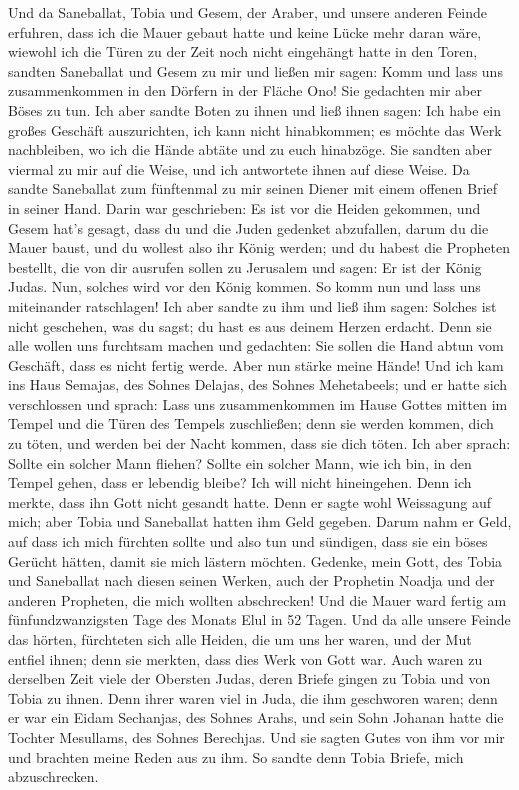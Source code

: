  Und da Saneballat, Tobia und Gesem, der Araber, und
unsere anderen Feinde erfuhren, dass ich die Mauer gebaut hatte und
keine Lücke mehr daran wäre, wiewohl ich die Türen zu der Zeit noch
nicht eingehängt hatte in den Toren,  sandten Saneballat
und Gesem zu mir und ließen mir sagen: Komm und lass uns zusammenkommen
in den Dörfern in der Fläche Ono! Sie gedachten mir aber Böses zu tun.
 Ich aber sandte Boten zu ihnen und ließ ihnen sagen: Ich
habe ein großes Geschäft auszurichten, ich kann nicht hinabkommen; es
möchte das Werk nachbleiben, wo ich die Hände abtäte und zu euch
hinabzöge.  Sie sandten aber viermal zu mir auf die Weise,
und ich antwortete ihnen auf diese Weise.  Da sandte
Saneballat zum fünftenmal zu mir seinen Diener mit einem offenen Brief
in seiner Hand.  Darin war geschrieben: Es ist vor die
Heiden gekommen, und Gesem hat's gesagt, dass du und die Juden gedenket
abzufallen, darum du die Mauer baust, und du wollest also ihr König
werden;  und du habest die Propheten bestellt, die von dir
ausrufen sollen zu Jerusalem und sagen: Er ist der König Judas. Nun,
solches wird vor den König kommen. So komm nun und lass uns miteinander
ratschlagen!  Ich aber sandte zu ihm und ließ ihm sagen:
Solches ist nicht geschehen, was du sagst; du hast es aus deinem Herzen
erdacht.  Denn sie alle wollen uns furchtsam machen und
gedachten: Sie sollen die Hand abtun vom Geschäft, dass es nicht fertig
werde. Aber nun stärke meine Hände!  Und ich kam ins Haus
Semajas, des Sohnes Delajas, des Sohnes Mehetabeels; und er hatte sich
verschlossen und sprach: Lass uns zusammenkommen im Hause Gottes mitten
im Tempel und die Türen des Tempels zuschließen; denn sie werden kommen,
dich zu töten, und werden bei der Nacht kommen, dass sie dich töten.
 Ich aber sprach: Sollte ein solcher Mann fliehen? Sollte
ein solcher Mann, wie ich bin, in den Tempel gehen, dass er lebendig
bleibe? Ich will nicht hineingehen.  Denn ich merkte,
dass ihn Gott nicht gesandt hatte. Denn er sagte wohl Weissagung auf
mich; aber Tobia und Saneballat hatten ihm Geld gegeben. 
Darum nahm er Geld, auf dass ich mich fürchten sollte und also tun und
sündigen, dass sie ein böses Gerücht hätten, damit sie mich lästern
möchten.  Gedenke, mein Gott, des Tobia und Saneballat
nach diesen seinen Werken, auch der Prophetin Noadja und der anderen
Propheten, die mich wollten abschrecken!  Und die Mauer
ward fertig am fünfundzwanzigsten Tage des Monats Elul in 52 Tagen.
 Und da alle unsere Feinde das hörten, fürchteten sich
alle Heiden, die um uns her waren, und der Mut entfiel ihnen; denn sie
merkten, dass dies Werk von Gott war.  Auch waren zu
derselben Zeit viele der Obersten Judas, deren Briefe gingen zu Tobia
und von Tobia zu ihnen.  Denn ihrer waren viel in Juda,
die ihm geschworen waren; denn er war ein Eidam Sechanjas, des Sohnes
Arahs, und sein Sohn Johanan hatte die Tochter Mesullams, des Sohnes
Berechjas.  Und sie sagten Gutes von ihm vor mir und
brachten meine Reden aus zu ihm. So sandte denn Tobia Briefe, mich
abzuschrecken.

